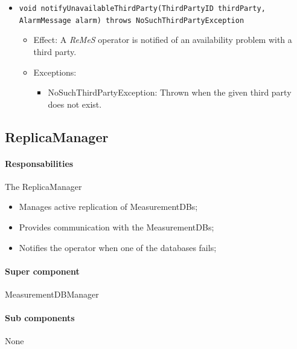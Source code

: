 \documentclass[a4paper,10pt]{article}
\newcommand{\rem}{\emph{ReMeS}\xspace}
\begin{document}
\begin{itemize}
\begin{itemize}
        \item \texttt{void notifyUnavailableThirdParty(ThirdPartyID thirdParty, AlarmMessage alarm) throws NoSuchThirdPartyException}
        \begin{itemize}
            \item Effect: A \rem operator is notified of an availability problem with a third party.
            \item Exceptions:
            \begin{itemize}
                \item NoSuchThirdPartyException: Thrown when the given third party does not exist.
            \end{itemize}
		\end{itemize}
    \end{itemize}
\end{itemize}


\subsection{ReplicaManager}
\paragraph{Responsabilities} 
The ReplicaManager
\begin{itemize}
	\item Manages active replication of MeasurementDBs;
    \item Provides communication with the MeasurementDBs;
    \item Notifies the operator when one of the databases fails;
\end{itemize}

\paragraph{Super component} MeasurementDBManager

\paragraph{Sub components} None
\end{document}
